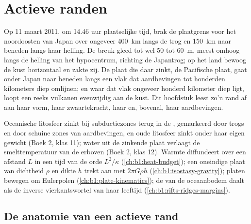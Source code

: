 \chapter{Actieve randen}\label{ch:b1:active-margins}

Op 11 maart 2011, om 14.46 uur plaatselijke tijd, brak de plaatgrens voor het noordoosten van Japan over ongeveer \qty{400}{km} langs de trog en \qty{150}{km} naar beneden langs haar helling. De breuk gleed tot wel 50 tot \qty{60}{m}, meest omhoog langs de helling van het hypocentrum, richting de Japantrog; op het land bewoog de kust horizontaal en zakte zij. De plaat die daar zinkt, de Pacifische plaat, gaat onder Japan naar beneden langs een vlak dat aardbevingen tot honderden kilometers diep omlijnen; en waar dat vlak ongeveer honderd kilometer diep ligt, loopt een reeks vulkanen evenwijdig aan de kust. Dit hoofdstuk leest zo'n rand af aan haar vorm, haar zwaartekracht, haar  en, bovenal, haar aardbevingen.

\begin{recall}
Oceanische litosfeer zinkt bij subductiezones terug in de , gemarkeerd door trogs en door schuine zones van aardbevingen, en oude litosfeer zinkt onder haar eigen gewicht (Boek 2, klas 11); water uit de zinkende plaat verlaagt de smelttemperatuur van de  erboven (Boek 2, klas 12). Warmte diffundeert over een afstand $L$ in een tijd van de orde $L^2/\kappa$ (\cref{ch:b1:heat-budget}); een oneindige plaat van dichtheid $\rho$ en dikte $h$ trekt aan met $2\pi G\rho h$ (\cref{ch:b1:isostasy-gravity}); platen bewegen om Eulerpolen (\cref{ch:b1:plate-kinematics}); de  van de oceaanbodem daalt als de inverse vierkantswortel van haar leeftijd (\cref{ch:b1:rifts-ridges-margins}).
\end{recall}

\section{De anatomie van een actieve rand}\label{sec:b1:active-margins:anatomy}

